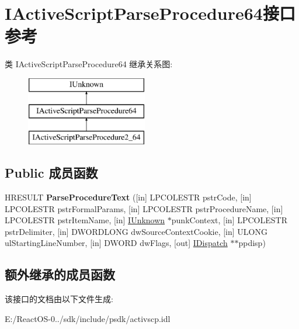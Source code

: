 \hypertarget{interface_i_active_script_parse_procedure64}{}\section{I\+Active\+Script\+Parse\+Procedure64接口 参考}
\label{interface_i_active_script_parse_procedure64}
类 I\+Active\+Script\+Parse\+Procedure64 继承关系图\+:\begin{figure}[H]
\begin{center}
\leavevmode
\includegraphics[height=3.000000cm]{interface_i_active_script_parse_procedure64}
\end{center}
\end{figure}
\subsection*{Public 成员函数}
\begin{DoxyCompactItemize}
\item 
\mbox{\label{interface_i_active_script_parse_procedure64_aa5ec9bdf36dac23646d525e24e90ea1c}} 
H\+R\+E\+S\+U\+LT {\bfseries Parse\+Procedure\+Text} (\mbox{[}in\mbox{]} L\+P\+C\+O\+L\+E\+S\+TR pstr\+Code, \mbox{[}in\mbox{]} L\+P\+C\+O\+L\+E\+S\+TR pstr\+Formal\+Params, \mbox{[}in\mbox{]} L\+P\+C\+O\+L\+E\+S\+TR pstr\+Procedure\+Name, \mbox{[}in\mbox{]} L\+P\+C\+O\+L\+E\+S\+TR pstr\+Item\+Name, \mbox{[}in\mbox{]} \hyperlink{interface_i_unknown}{I\+Unknown} $\ast$punk\+Context, \mbox{[}in\mbox{]} L\+P\+C\+O\+L\+E\+S\+TR pstr\+Delimiter, \mbox{[}in\mbox{]} D\+W\+O\+R\+D\+L\+O\+NG dw\+Source\+Context\+Cookie, \mbox{[}in\mbox{]} U\+L\+O\+NG ul\+Starting\+Line\+Number, \mbox{[}in\mbox{]} D\+W\+O\+RD dw\+Flags, \mbox{[}out\mbox{]} \hyperlink{interface_i_dispatch}{I\+Dispatch} $\ast$$\ast$ppdisp)
\end{DoxyCompactItemize}
\subsection*{额外继承的成员函数}


该接口的文档由以下文件生成\+:\begin{DoxyCompactItemize}
\item 
E\+:/\+React\+O\+S-\/0../sdk/include/psdk/activscp.\+idl\end{DoxyCompactItemize}
